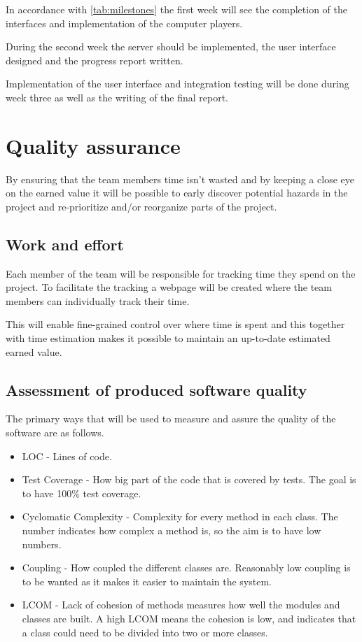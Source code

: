 \documentclass[10pt, titlepage, oneside, a4paper]{article}
\begin{document}
			In accordance with \tablename{} \ref{tab:milestones} the first week will see the completion of the interfaces and implementation of the computer players.
			
			During the second week the server should be implemented, the user interface designed and the progress report written.
			
			Implementation of the user interface and integration testing will be done during week three as well as the writing of the final report.

	\section{Quality assurance}
	
	
	By ensuring that the team members time isn't wasted and by keeping a close eye on the earned value it will be possible to early discover potential hazards in the project and re-prioritize and/or reorganize parts of the project.
	
		\subsection{Work and effort}
		
		Each member of the team will be responsible for tracking time they spend on the project. To facilitate the tracking a webpage will be created where the team members can individually track their time.
		
		This will enable fine-grained control over where time is spent and this together with time estimation makes it possible to maintain an up-to-date estimated earned value.

		\subsection{Assessment of produced software quality}
		
		The primary ways that will be used to measure and assure the quality of the software are as follows.
		\begin{itemize}
			\item LOC - Lines of code.
			\item Test Coverage - How big part of the code that is covered by tests. The goal is to have 100\% test coverage.
			\item Cyclomatic Complexity - Complexity for every method in each class. The number indicates how complex a method is, so the aim is to have low numbers.
			\item Coupling - How coupled the different classes are. Reasonably low coupling is to be wanted as it makes it easier to maintain the system.
			\item LCOM - Lack of cohesion of methods measures how well the modules and classes are built. A high LCOM means the cohesion is low, and indicates that a class could need to be divided into two or more classes.
		\end{itemize}
\end{document}

